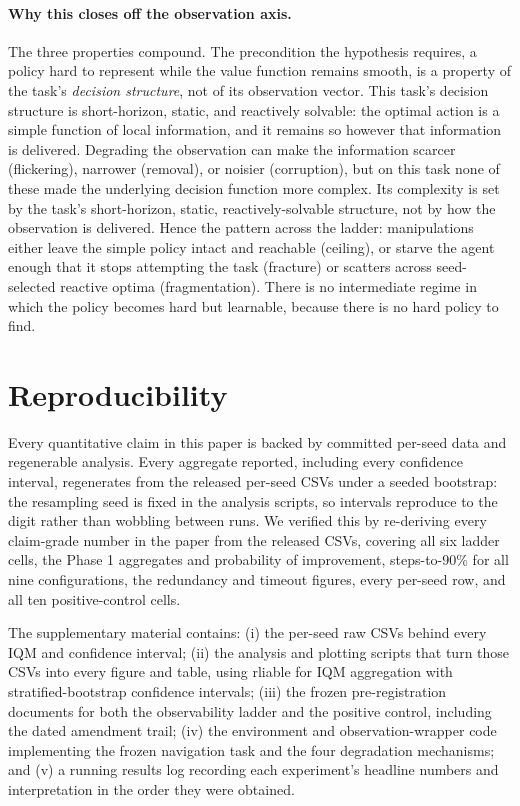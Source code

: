 \paragraph{Why this closes off the observation axis.} The three properties compound. The
precondition the hypothesis requires, a policy hard to represent while the value function
remains smooth, is a property of the task's \emph{decision structure}, not of its observation
vector. This task's decision structure is short-horizon, static, and reactively solvable: the
optimal action is a simple function of local information, and it remains so however that
information is delivered. Degrading the observation can make the information scarcer
(flickering), narrower (removal), or noisier (corruption), but on this task none of these made
the underlying decision function more complex. Its complexity is set by the task's
short-horizon, static, reactively-solvable structure, not by how the observation is delivered.
Hence the pattern across the ladder: manipulations either leave the simple policy intact and
reachable (ceiling), or starve the agent enough that it stops attempting the task (fracture)
or scatters across seed-selected reactive optima (fragmentation). There is no intermediate
regime in which the policy becomes hard but learnable, because there is no hard policy to
find.

\clearpage
\section{Reproducibility}
\label{app:repro}

Every quantitative claim in this paper is backed by committed per-seed data and regenerable
analysis. Every aggregate reported, including every confidence interval, regenerates from the
released per-seed CSVs under a seeded bootstrap: the resampling seed is fixed in the analysis
scripts, so intervals reproduce to the digit rather than wobbling between runs. We verified
this by re-deriving every claim-grade number in the paper from the released CSVs, covering all
six ladder cells, the Phase 1 aggregates and probability of improvement, steps-to-90\% for all
nine configurations, the redundancy and timeout figures, every per-seed row, and all ten
positive-control cells.

The supplementary material contains: (i) the per-seed raw CSVs behind every IQM and confidence
interval; (ii) the analysis and plotting scripts that turn those CSVs into every figure and
table, using rliable for IQM aggregation with stratified-bootstrap confidence intervals;
(iii) the frozen pre-registration documents for both the observability ladder and the positive
control, including the dated amendment trail; (iv) the environment and observation-wrapper
code implementing the frozen navigation task and the four degradation mechanisms; and (v) a
running results log recording each experiment's headline numbers and interpretation in the
order they were obtained.

